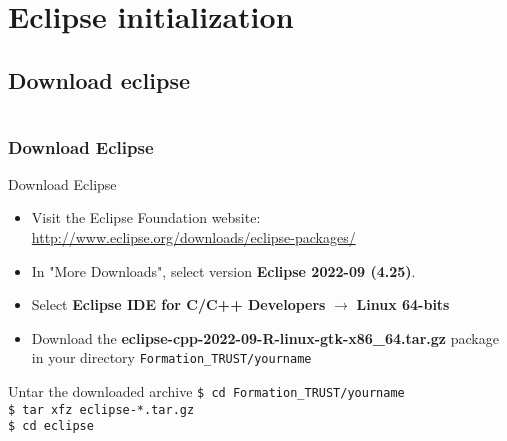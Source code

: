 \documentclass[10pt, hyperref={unicode=true,pdfusetitle, bookmarks=true,bookmarksnumbered=false,bookmarksopen=false, breaklinks=false,pdfborder={0 0 1},backref=true,colorlinks=true,linkcolor=darkblue,pageanchor, urlcolor=darkblue}]{beamer}
\begin{document}
\section{{\bf{Eclipse initialization}}}
\subsection{{\bf{Download eclipse}}}
\begin{frame}
\begin{columns}[c] 
\tableofcontents[sections={1-4},currentsection, currentsubsection]
\tableofcontents[sections={5-10},currentsection, currentsubsection]
\end{columns}
\end{frame}
\begin{frame}
\frametitle{Download Eclipse}

\begin{exampleblock}{Download Eclipse}
\begin{itemize}
\item Visit the Eclipse Foundation website: \url{http://www.eclipse.org/downloads/eclipse-packages/}
\item In "More Downloads", select version  \textbf{Eclipse 2022-09 (4.25)}.
\item Select \textbf{Eclipse IDE for C/C++ Developers} $\rightarrow$ \textbf{Linux 64-bits}
\item Download the \textbf{eclipse-cpp-2022-09-R-linux-gtk-x86\_64.tar.gz} package in your directory \texttt{Formation\_TRUST/yourname}
\end{itemize}
\end{exampleblock}

\begin{exampleblock}{Untar the downloaded archive}
 \texttt{\$ cd Formation\_TRUST/yourname} \\
 \texttt{\$ tar xfz eclipse-*.tar.gz} \\
 \texttt{\$ cd eclipse}
\end{exampleblock}

\end{frame}
\end{document}

